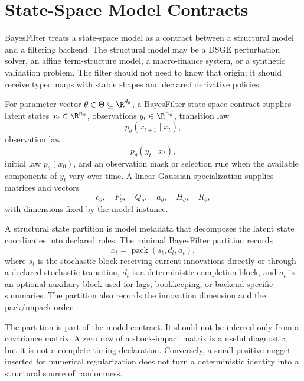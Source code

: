 \chapter{State-Space Model Contracts}
\label{ch:bf-state-space-contracts}

BayesFilter treats a state-space model as a contract between a structural model
and a filtering backend.  The structural model may be a DSGE perturbation
solver, an affine term-structure model, a macro-finance system, or a synthetic
validation problem.  The filter should not need to know that origin; it should
receive typed maps with stable shapes and declared derivative policies.

\begin{definition}
\label{def:bf-ssm-contract}
For parameter vector $\theta \in \Theta \subseteq \R^{d_\theta}$, a
BayesFilter state-space contract supplies latent states $x_t \in \R^{n_x}$,
observations $y_t \in \R^{n_y}$, transition law
\[
  p_\theta(x_{t+1}\mid x_t),
\]
observation law
\[
  p_\theta(y_t\mid x_t),
\]
initial law $p_\theta(x_0)$, and an observation mask or selection rule when the
available components of $y_t$ vary over time.  A linear Gaussian specialization
supplies matrices and vectors
\[
  c_\theta,\quad F_\theta,\quad Q_\theta,\quad
  a_\theta,\quad H_\theta,\quad R_\theta,
\]
with dimensions fixed by the model instance.
\end{definition}

\begin{definition}
\label{def:bf-structural-state-partition}
A structural state partition is model metadata that decomposes the latent state
coordinates into declared roles.  The minimal BayesFilter partition records
\[
  x_t = \operatorname{pack}(s_t,d_t,a_t),
\]
where $s_t$ is the stochastic block receiving current innovations directly or
through a declared stochastic transition, $d_t$ is a deterministic-completion
block, and $a_t$ is an optional auxiliary block used for lags, bookkeeping, or
backend-specific summaries.  The partition also records the innovation
dimension and the pack/unpack order.
\end{definition}

The partition is part of the model contract.  It should not be inferred only
from a covariance matrix.  A zero row of a shock-impact matrix is a useful
diagnostic, but it is not a complete timing declaration.  Conversely, a small
positive nugget inserted for numerical regularization does not turn a
deterministic identity into a structural source of randomness.

